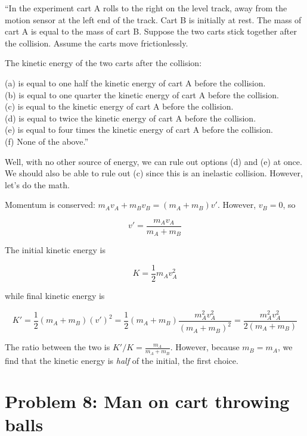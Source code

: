 \documentclass[12pt,a4paper]{report}
\begin{document}
``In the experiment cart A rolls to the right on the level track, away from the motion sensor at the left end of the track. Cart B is initially at rest. The mass of cart A is equal to the mass of cart B. Suppose the two carts stick together after the collision. Assume the carts move frictionlessly.

The kinetic energy of the two carts after the collision:

(a) is equal to one half the kinetic energy of cart A before the collision.\\
(b) is equal to one quarter the kinetic energy of cart A before the collision.\\
(c) is equal to the kinetic energy of cart A before the collision.\\
(d) is equal to twice the kinetic energy of cart A before the collision.\\
(e) is equal to four times the kinetic energy of cart A before the collision.\\
(f) None of the above.''

Well, with no other source of energy, we can rule out options (d) and (e) at once. We should also be able to rule out (c) since this is an inelastic collision. However, let's do the math.

Momentum is conserved: $m_A v_A + m_B v_B = (m_A + m_B) v'$. However, $v_B = 0$, so

\begin{equation}
v' = \frac{m_A v_A}{m_A + m_B}
\end{equation}

The initial kinetic energy is

\begin{equation}
K = \frac{1}{2} m_A v_A^2
\end{equation}

while final kinetic energy is

\begin{equation}
K' = \frac{1}{2} (m_A + m_B) (v')^2 = \frac{1}{2} (m_A + m_B) \frac{m_A^2 v_A^2}{(m_A + m_B)^2} = \frac{m_A^2 v_A^2}{2(m_A + m_B)}
\end{equation}

The ratio between the two is $K'/K = \frac{m_A}{m_A + m_B}$. However, because $m_B = m_A$, we find that the kinetic energy is \emph{half} of the initial, the first choice.

\section{Problem 8: Man on cart throwing balls}
\end{document}
